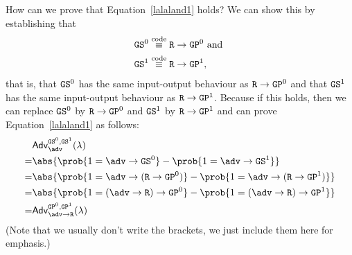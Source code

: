 How can we prove that Equation~\ref{lalaland1} holds? We can show this by establishing that
\begin{align}
      \notag           & \text{\texttt{GS}}^0\stackrel{\text{code}}{\equiv}\text{\texttt{R}}\rightarrow\text{\texttt{GP}}^0\text{ and } \\
      \label{lalaland} & \text{\texttt{GS}}^1\stackrel{\text{code}}{\equiv}\text{\texttt{R}}\rightarrow\text{\texttt{GP}}^1,
\end{align}
that is, that $\text{\texttt{GS}}^0$ has the same input-output behaviour as $\text{\texttt{R}}\rightarrow\text{\texttt{GP}}^0$
and that $\text{\texttt{GS}}^1$ has the same input-output behaviour as $\text{\texttt{R}}\rightarrow\text{\texttt{GP}}^1$.
Because if this holds, then we can replace $\text{\texttt{GS}}^0$ by $\text{\texttt{R}}\rightarrow\text{\texttt{GP}}^0$
and $\text{\texttt{GS}}^1$ by $\text{\texttt{R}}\rightarrow\text{\texttt{GP}}^1$ and can prove Equation~\ref{lalaland1} as follows:
\begin{align*}
        & \mathsf{Adv}^{\M{GS}^0,\M{GS}^1}_\adv(\lambda)                                                              \\
      = & \abs{\prob{1=\adv\rightarrow\M{GS}^0}-\prob{1=\adv\rightarrow\M{GS}^1}}                                     \\
      = & \abs{\prob{1=\adv\rightarrow(\M{R}\rightarrow\M{GP}^0)}-\prob{1=\adv\rightarrow(\M{R}\rightarrow\M{GP}^1)}} \\
      = & \abs{\prob{1=(\adv\rightarrow\M{R})\rightarrow\M{GP}^0}-\prob{1=(\adv\rightarrow\M{R})\rightarrow\M{GP}^1}} \\
      = & \mathsf{Adv}^{\M{GP}^0,\M{GP}^1}_{\adv\rightarrow\M{R}}(\lambda)
\end{align*}
(Note that we usually don't write the brackets, we just include them here for emphasis.)

